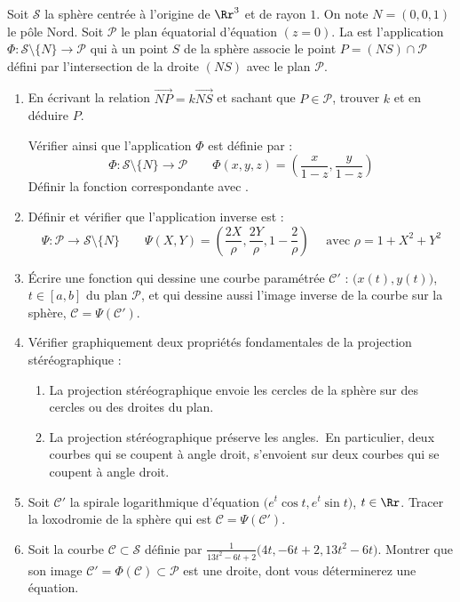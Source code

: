 \documentclass[class=report,crop=false]{standalone}
\newcommand{\vect}{\overrightarrow}
\begin{document}
\begin{tp}
Soit $ \mathcal{S}$ la sphère centrée à l'origine de $\Rr^3$ et de rayon $1$.
On note $N = (0,0,1)$ le pôle Nord. Soit $\mathcal{P}$ le plan
équatorial d'équation $(z=0)$. La 
est l'application $\Phi : \mathcal{S} \setminus \{N\} \to \mathcal{P}$
qui à un point $S$ de la sphère associe le point $P = (NS) \cap \mathcal{P}$
défini par l'intersection de la droite $(NS)$ avec le plan $\mathcal{P}$.

\begin{enumerate}
  \item En écrivant la relation $\vect{NP} = k \vect{NS}$ et sachant que $P \in \mathcal{P}$, trouver
  $k$ et en déduire $P$.
  
  Vérifier ainsi que l'application $\Phi$ est définie par :
  $$\Phi : \mathcal{S} \setminus \{N\} \to \mathcal{P} \qquad 
  \Phi(x,y,z) = \left( \frac{x}{1-z}, \frac{y}{1-z} \right)$$
  Définir la fonction correspondante avec \Sage.
  
  \item  Définir et vérifier que l'application inverse est :
  $$\Psi : \mathcal{P} \to \mathcal{S} \setminus \{N\} \qquad
  \Psi (X,Y) = \left( \frac{2X}{\rho},\frac{2Y}{\rho},1-\frac{2}{\rho}  \right) \quad \text{ avec } \rho = 1+X^2+Y^2$$
      
  \item \'Ecrire une fonction qui dessine une courbe paramétrée $\mathcal{C}'$ : $\big( x(t),y(t) \big)$, $t\in[a,b]$
  du plan $\mathcal{P}$, et qui dessine aussi l'image inverse de la courbe sur la sphère, $\mathcal{C} = 
  \Psi(\mathcal{C}')$.
 
  
  \item Vérifier graphiquement deux propriétés fondamentales de la projection stéréographique :
  \begin{enumerate}
    \item \og La projection stéréographique envoie les cercles de la sphère sur des cercles ou des droites du plan.\fg
    \item \og La projection stéréographique préserve les angles.\fg\ En particulier, deux courbes qui se coupent
    à angle droit, s'envoient sur deux courbes qui se coupent à angle droit.
  \end{enumerate}
  
  \item Soit $\mathcal{C}'$ la spirale logarithmique d'équation
  $\big( e^t \cos t, e^t \sin t \big)$, $t \in \Rr$.
  Tracer la loxodromie de la sphère qui est $\mathcal{C} = 
  \Psi(\mathcal{C}')$. 
  
  \item  Soit la courbe $\mathcal{C} \subset \mathcal{S}$
  définie par $\frac{1}{13t^2 - 6t + 2}\big(4t, -6t + 2, 13t^2 - 6t\big)$.
  Montrer que son image $\mathcal{C}' = \Phi(\mathcal{C}) \subset \mathcal{P}$
  est une droite, dont vous déterminerez une équation.
  
\end{enumerate}

\end{tp}
\end{document}
